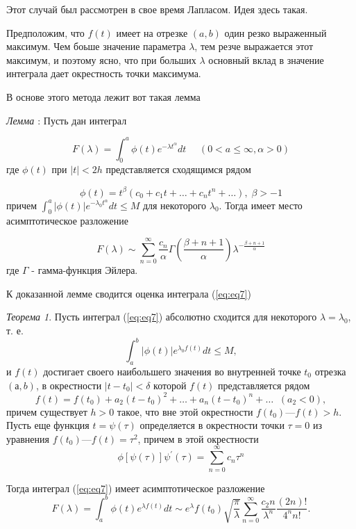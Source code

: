 \documentclass[14pt]{extarticle}
\begin{document}
Этот случай был рассмотрен в свое время Лапласом. Идея здесь такая. 

Предположим, что $f(t)$ имеет на отрезке $(a, b)$ один резко выраженный максимум. Чем боьше значение параметра $\lambda$, тем резче выражается этот максимум, и поэтому ясно, что при больших $\lambda$ основный вклад в значение интеграла дает окрестность точки максимума. 

В основе этого метода лежит вот такая лемма

\textit{Лемма \label{lemma:lemma1}}: Пусть дан интеграл

$$
F(\lambda) = \int_{0}^{a}\phi(t)e^{-\lambda t^\alpha}dt \:\:\:\:\:\: (0 < a \le \infty, \alpha>0)
$$
где $\phi(t)$ при $|t|<2h$ представляется сходящимся рядом

$$
\phi(t)=t^\beta(c_0+c_1 t+\dots+c_n t^n+\dots), \; \beta>-1
$$
причем $\int_{0}^{a}|\phi(t)| e^{-\lambda_0 t^\alpha}dt\le M$ для некоторого $\lambda_0$. Тогда имеет место асимптотическое разложение

\begin{equation}\label{eq:eq8}
F(\lambda) \sim \sum_{n=0}^{\infty}\frac{c_n}{\alpha} \Gamma\left(\frac{\beta + n + 1}{\alpha}\right)\lambda^{-\frac{\beta + n + 1}{\alpha}}
\end{equation} 
где $\Gamma$ - гамма-функция Эйлера.

К доказанной лемме сводится оценка интеграла (\ref{eq:eq7})

\textit{Теорема 1\label{th:th1}}. Пусть интеграл (\ref{eq:eq7}) абсолютно сходится для некоторого $\lambda = \lambda_0$, т. е.
$$
\int_{a}^{b} |\phi(t)|e^{\lambda_0 f(t)}dt \le M,
$$
и $f(t)$ достигает своего наибольшего значения во внутренней точке $t_0$ отрезка $(а, b)$, в окрестности $| t - t_0| < \delta$ которой $f(t)$ представляется рядом
$$
f(t)=f(t_0) + a_2(t-t_0)^2+\dots+a_n(t-t_0)^n+\dots \;\; (a_2<0),
$$
причем существует $h > 0$ такое, что вне этой окрестности $f (t_0) — f(t) > h$. Пусть еще функция $t = \psi(\tau)$ определяется в окрестности точки $\tau = 0$ из уравнения $f(t_0) — f(t) = \tau^2$, причем в этой окрестности
\begin{equation}\label{eq:eq9}
\phi[\psi(\tau)]\psi^\prime(\tau) = \sum_{n=0}^{\infty} c_n\tau^n
\end{equation}

Тогда интеграл (\ref{eq:eq7}) имеет асимптотическое разложение
$$
F(\lambda)=\int_{a}^{b}\phi(t)e^{\lambda f(t)}dt \sim e^\lambda f(t_0) \sqrt{\frac{\pi}{\lambda}} \sum_{n=0}^{\infty}\frac{c_2n}{\lambda^n}\frac{(2n)!}{4^n n!}.
$$
  
\end{document}
